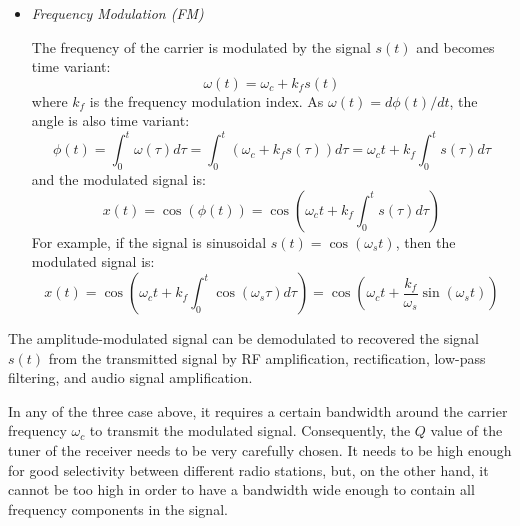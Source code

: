 \documentclass{article}
\begin{document}
\begin{itemize}
\item {\em Frequency Modulation (FM)}  
  
  The frequency of the carrier is modulated by the signal $s(t)$ and becomes
  time variant:
  \begin{equation}
    \omega(t)=\omega_c+k_f s(t)
  \end{equation}
  where $k_f$ is the frequency modulation index. As $\omega(t) =d\phi(t)/dt$,
  the angle is also time variant:
  \begin{equation}
    \phi(t)=\int_0^t\omega(\tau)d\tau=\int_0^t ( \omega_c+k_f s(\tau)) d\tau
    =\omega_c t+k_f \int_0^t s(\tau)d\tau
  \end{equation}
  and the modulated signal is:
  \begin{equation} 
    x(t)=\cos(\phi(t))=\cos\left(\omega_c t+k_f \int_0^t s(\tau)d\tau\right)
  \end{equation}
  For example, if the signal is sinusoidal $s(t)=\cos(\omega_s t)$, then
  the modulated signal is:
  \begin{equation} 
    x(t)=\cos\left(\omega_c t+k_f \int_0^t \cos(\omega_s \tau)d\tau\right)
    =\cos\left(\omega_c t+\frac{k_f}{\omega_s} \sin(\omega_s t)\right)
  \end{equation}


\end{itemize}

The amplitude-modulated signal can be demodulated to recovered the signal
$s(t)$ from the transmitted signal by RF amplification, rectification, 
low-pass filtering, and audio signal amplification.

  


In any of the three case above, it requires a certain bandwidth around the
carrier frequency $\omega_c$ to transmit the modulated signal. Consequently, 
the $Q$ value of the tuner of the receiver needs to be very carefully chosen.
It needs to be high enough for good selectivity between different radio 
stations, but, on the other hand, it cannot be too high in order to have a 
bandwidth wide enough to contain all frequency components in the signal.
\end{document}
